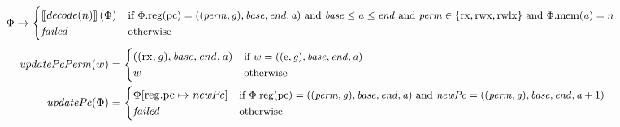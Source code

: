 \documentclass[compsoc,conference,letterpaper,fleqn]{IEEEtran}
\newcommand{\update}[2]{[#1 \mapsto #2]}
\newcommand{\sem}[1]{\left\llbracket #1 \right\rrbracket}
\newcommand{\var}[1]{\mathit{#1}}
\newcommand{\gl}{\var{g}}
\newcommand{\pcreg}{\mathrm{pc}}
\newcommand{\addr}{\var{a}}
\newcommand{\start}{\var{base}}
\newcommand{\addrend}{\var{end}}
\newcommand{\perm}{\var{perm}}
\newcommand{\stdcap}[1][(\perm,\gl)]{\left(#1,\start,\addrend,\addr \right)}
\newcommand{\plainproj}[1]{\mathrm{#1}}
\newcommand{\memheap}[1][\Phi]{#1.\plainproj{mem}}
\newcommand{\memreg}[1][\Phi]{#1.\plainproj{reg}}
\newcommand{\updateReg}[3][\Phi]{#1\update{\plainproj{reg}.#2}{#3}}
\newcommand{\failed}{\mathit{failed}}
\newcommand{\plainfun}[2]{
  \ifthenelse{\equal{#2}{}}
  {\mathit{#1}}
  {\mathit{#1}(#2)}
}
\newcommand{\decode}{\plainfun{decode}{}}
\newcommand{\updatePcPerm}[1]{\plainfun{updatePcPerm}{#1}}
\newcommand{\stdUpdatePc}[1]{\plainfun{updatePc}{#1}}
\newcommand{\plainperm}[1]{\mathrm{#1}}
\newcommand{\exec}{\plainperm{rx}}
\newcommand{\entry}{\plainperm{e}}
\newcommand{\rwx}{\plainperm{rwx}}
\newcommand{\rwlx}{\plainperm{rwlx}}
\begin{document}
\begin{figure}
  \centering
  \begin{equation*}
    \Phi  \rightarrow
    \begin{cases}
      \sem{\decode(n)}(\Phi) & \text{\footnotesize{if $\memreg(\pcreg) = \stdcap$ and $\start \leq \addr \leq \addrend$ and $\perm \in \{ \exec,\rwx, \rwlx \}$ and $\memheap(\addr) = n$ }}\\
      \failed                                 & \text{\footnotesize{otherwise}}
    \end{cases}
  \end{equation*}\vspace{-.3cm}%
  \begin{align*}
    \updatePcPerm{w} &=
                       \begin{cases}
                         ((\exec,\gl),\start,\addrend,\addr) & \text{\footnotesize{if $w = ((\entry,\gl),\start,\addrend,\addr)$}}\\
                         w & \text{\footnotesize{otherwise}}
                       \end{cases}\\
    \stdUpdatePc{\Phi} &=
                         \begin{cases}
                           \updateReg{\pcreg}{\var{newPc}} & \arraycolsep=0pt
                             \text{\footnotesize{if $\memreg(\pcreg) = \stdcap$ and $\var{newPc} = ((\perm,\gl),\start,\addrend,\addr + 1)$}}\\
                             \failed & \text{\footnotesize{otherwise}}
                         \end{cases}
  \end{align*}


\end{figure}
\end{document}
